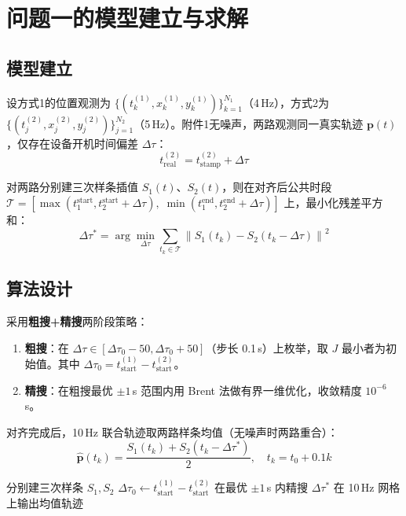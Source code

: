 \section{问题一的模型建立与求解}\label{sec:model1}

\subsection{模型建立}

设方式1的位置观测为 $\{(t_k^{(1)}, x_k^{(1)}, y_k^{(1)})\}_{k=1}^{N_1}$（4\,Hz），方式2为 $\{(t_j^{(2)}, x_j^{(2)}, y_j^{(2)})\}_{j=1}^{N_2}$（5\,Hz）。附件1无噪声，两路观测同一真实轨迹 $\boldsymbol{p}(t)$，仅存在设备开机时间偏差 $\Delta\tau$：
\begin{equation}
    t_{\text{real}}^{(2)} = t^{(2)}_{\text{stamp}} + \Delta\tau
    \label{eq:time_offset}
\end{equation}

对两路分别建三次样条插值 $S_1(t)$、$S_2(t)$，则在对齐后公共时段 $\mathcal{T} = [\max(t_1^{\text{start}}, t_2^{\text{start}} + \Delta\tau),\; \min(t_1^{\text{end}}, t_2^{\text{end}} + \Delta\tau)]$ 上，最小化残差平方和：
\begin{equation}
    \Delta\tau^* = \arg\min_{\Delta\tau} \sum_{t_k \in \mathcal{T}} \left\| S_1(t_k) - S_2(t_k - \Delta\tau) \right\|^2
    \label{eq:p1_obj}
\end{equation}

\subsection{算法设计}

采用\textbf{粗搜+精搜}两阶段策略：
\begin{enumerate}
    \item \textbf{粗搜}：在 $\Delta\tau \in [\Delta\tau_0 - 50, \Delta\tau_0 + 50]$（步长 0.1\,s）上枚举，取 $J$ 最小者为初始值。其中 $\Delta\tau_0 = t_{\text{start}}^{(1)} - t_{\text{start}}^{(2)}$。
    \item \textbf{精搜}：在粗搜最优 $\pm 1$\,s 范围内用 Brent 法做有界一维优化，收敛精度 $10^{-6}$\,s。
\end{enumerate}

对齐完成后，10\,Hz 联合轨迹取两路样条均值（无噪声时两路重合）：
\begin{equation}
    \hat{\boldsymbol{p}}(t_k) = \frac{S_1(t_k) + S_2(t_k - \Delta\tau^*)}{2}, \quad t_k = t_0 + 0.1k
\end{equation}

\begin{algorithm}[H]
    \caption{问题一：时间对齐算法}
    \label{alg:solve1}
    分别建三次样条 $S_1, S_2$\;
    $\Delta\tau_0 \leftarrow t^{(1)}_{\text{start}} - t^{(2)}_{\text{start}}$\;
    在最优 $\pm 1$\,s 内精搜 $\Delta\tau^*$\;
    在 10\,Hz 网格上输出均值轨迹\;
    \;
\end{algorithm}

